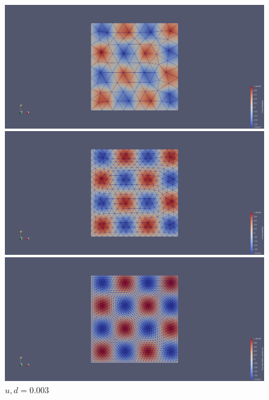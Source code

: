 \documentclass{article}
\begin{document}
\begin{figure}[!htb]
	\includegraphics[width=\textwidth]{img/32.png}
	\caption{$u, d = 0.15$}
	\endminipage\hfill
	\includegraphics[width=\textwidth]{img/64.png}
	\caption{$u, d = 0.076$}
	\endminipage\hfill
	\includegraphics[width=\textwidth]{img/128.png}
	\caption{$u, d = 0.003$}
	\endminipage
\end{figure}
\end{document}
